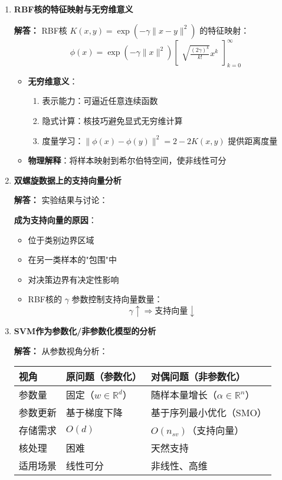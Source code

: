 \documentclass[a4paper,12pt]{book}
\begin{document}
\begin{enumerate}[label=\arabic*.]
    \item \textbf{RBF核的特征映射与无穷维意义}
    
    \textbf{解答：} RBF核 $K(x,y) = \exp(-\gamma\|x-y\|^2)$ 的特征映射：
    \[
    \phi(x) = \exp(-\gamma\|x\|^2) \begin{bmatrix} 
        \sqrt{\frac{(2\gamma)^k}{k!}} x^k 
    \end{bmatrix}_{k=0}^{\infty}
    \]
    
    \begin{itemize}
        \item \textbf{无穷维意义}：
        \begin{enumerate}
            \item 表示能力：可逼近任意连续函数
            \item 隐式计算：核技巧避免显式无穷维计算
            \item 度量学习：$\|\phi(x)-\phi(y)\|^2 = 2-2K(x,y)$ 提供距离度量
        \end{enumerate}
        \item \textbf{物理解释}：将样本映射到希尔伯特空间，使非线性可分
    \end{itemize}
    
    \item \textbf{双螺旋数据上的支持向量分析}
    
    \textbf{解答：} 实验结果与讨论：
   
    
    \textbf{成为支持向量的原因}：
    \begin{itemize}
        \item 位于类别边界区域
        \item 在另一类样本的"包围"中
        \item 对决策边界有决定性影响
        \item RBF核的 $\gamma$ 参数控制支持向量数量：
        \[
        \gamma \uparrow \Rightarrow \text{支持向量} \downarrow
        \]
    \end{itemize}
    
    \item \textbf{SVM作为参数化/非参数化模型的分析}
    
    \textbf{解答：} 从参数视角分析：
    \begin{table}[h]
        \centering
        \begin{tabular}{l|l|l}
            \toprule
            \textbf{视角} & \textbf{原问题（参数化）} & \textbf{对偶问题（非参数化）} \\
            \midrule
            参数量 & 固定（$w \in \mathbb{R}^d$） & 随样本量增长（$\alpha \in \mathbb{R}^n$） \\
            参数更新 & 基于梯度下降 & 基于序列最小优化（SMO） \\
            存储需求 & $O(d)$ & $O(n_{sv})$（支持向量） \\
            核处理 & 困难 & 天然支持 \\
            适用场景 & 线性可分 & 非线性、高维 \\
            \bottomrule
        \end{tabular}
    \end{table}
    

\end{enumerate}
\end{document}
